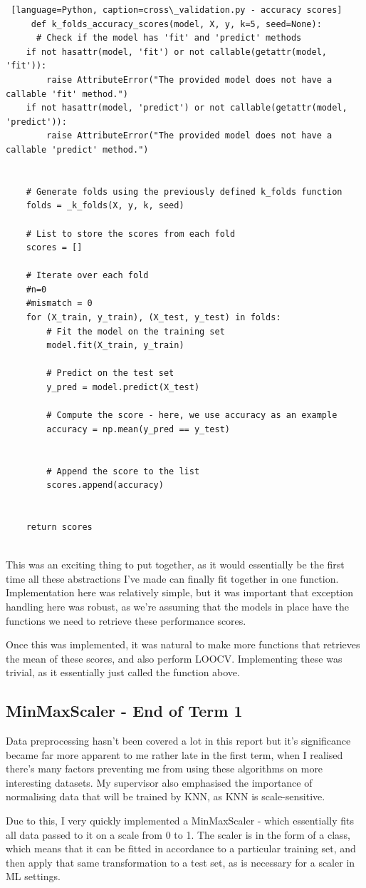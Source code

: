 \documentclass[letterpaper,10pt]{article}
\begin{document}
\begin{lstlisting} [language=Python, caption=cross\_validation.py - accuracy scores]
     def k_folds_accuracy_scores(model, X, y, k=5, seed=None):
      # Check if the model has 'fit' and 'predict' methods
    if not hasattr(model, 'fit') or not callable(getattr(model, 'fit')):
        raise AttributeError("The provided model does not have a callable 'fit' method.")
    if not hasattr(model, 'predict') or not callable(getattr(model, 'predict')):
        raise AttributeError("The provided model does not have a callable 'predict' method.")


    # Generate folds using the previously defined k_folds function
    folds = _k_folds(X, y, k, seed)

    # List to store the scores from each fold
    scores = []

    # Iterate over each fold
    #n=0
    #mismatch = 0
    for (X_train, y_train), (X_test, y_test) in folds:
        # Fit the model on the training set
        model.fit(X_train, y_train)

        # Predict on the test set
        y_pred = model.predict(X_test)

        # Compute the score - here, we use accuracy as an example
        accuracy = np.mean(y_pred == y_test)


        # Append the score to the list
        scores.append(accuracy)
       

    return scores
      
\end{lstlisting}
This was an exciting thing to put together, as it would essentially be the first time all these abstractions I've made can finally fit together in one function. Implementation here was relatively simple, but it was important that exception handling here was robust, as we're assuming that the models in place have the functions we need to retrieve these performance scores.  \par
Once this was implemented, it was natural to make more functions that retrieves the mean of these scores, and also perform LOOCV. Implementing these was trivial, as it essentially just called the function above. \par

\subsection{MinMaxScaler - End of Term 1}
Data preprocessing hasn't been covered a lot in this report but it's significance became far more apparent to me rather late in the first term, when I realised there's many factors preventing me from using these algorithms on more interesting datasets. My supervisor also emphasised the importance of normalising data that will be trained by KNN, as KNN is scale-sensitive. \par
Due to this, I very quickly implemented a MinMaxScaler - which essentially fits all data passed to it on a scale from 0 to 1. The scaler is in the form of a class, which means that it can be fitted in accordance to a particular training set, and then apply that same transformation to a test set, as is necessary for a scaler in ML settings. \par
\end{document}
